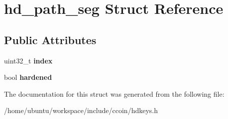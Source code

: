 \hypertarget{structhd__path__seg}{\section{hd\-\_\-path\-\_\-seg Struct Reference}
\label{structhd__path__seg}
}
\subsection*{Public Attributes}
\begin{DoxyCompactItemize}
\item 
\hypertarget{structhd__path__seg_a889038ffc5d27e90c3639fbfbf0a97c6}{uint32\-\_\-t {\bfseries index}}\label{structhd__path__seg_a889038ffc5d27e90c3639fbfbf0a97c6}

\item 
\hypertarget{structhd__path__seg_a86891de46212d2128a41910993848f73}{bool {\bfseries hardened}}\label{structhd__path__seg_a86891de46212d2128a41910993848f73}

\end{DoxyCompactItemize}


The documentation for this struct was generated from the following file\-:\begin{DoxyCompactItemize}
\item 
/home/ubuntu/workspace/include/ccoin/hdkeys.\-h\end{DoxyCompactItemize}
